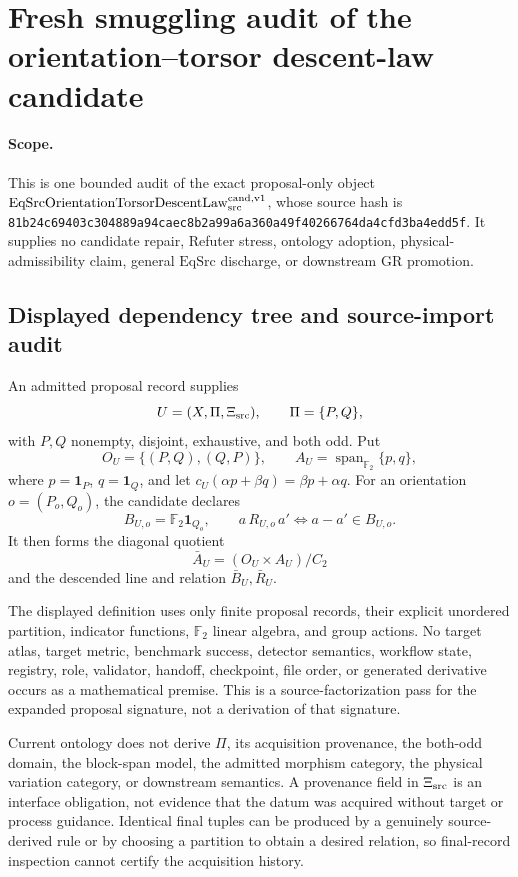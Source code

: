 \section{Fresh smuggling audit of the orientation--torsor descent-law candidate}

\paragraph{Scope.}
This is one bounded audit of the exact proposal-only object
\(\mathrm{EqSrcOrientationTorsorDescentLaw}_{\rm src}^{\rm cand,v1}\),
whose source hash is
\texttt{81b24c69403c304889a94caec8b2a99a6a360a49f40266764da4cfd3ba4edd5f}.
It supplies no candidate repair, Refuter stress, ontology adoption,
physical-admissibility claim, general \(\mathrm{EqSrc}\) discharge, or
downstream GR promotion.

\subsection{Displayed dependency tree and source-import audit}

An admitted proposal record supplies
\[
 U=(X,\Pi,\Xi_{\rm src}),\qquad \Pi=\{P,Q\},
\]
with \(P,Q\) nonempty, disjoint, exhaustive, and both odd.  Put
\[
 O_U=\{(P,Q),(Q,P)\},\qquad
 A_U=\operatorname{span}_{\mathbb F_2}\{p,q\},
\]
where \(p=\mathbf1_P\), \(q=\mathbf1_Q\), and let
\(c_U(\alpha p+\beta q)=\beta p+\alpha q\).  For an orientation
\(o=(P_o,Q_o)\), the candidate declares
\[
 B_{U,o}=\mathbb F_2\mathbf1_{Q_o},\qquad
 a\,R_{U,o}\,a'\Longleftrightarrow a-a'\in B_{U,o}.
\]
It then forms the diagonal quotient
\[
 \bar A_U=(O_U\times A_U)/C_2
\]
and the descended line and relation \(\bar B_U,\bar R_U\).

The displayed definition uses only finite proposal records, their explicit
unordered partition, indicator functions, \(\mathbb F_2\) linear algebra,
and group actions.  No target atlas, target metric, benchmark success,
detector semantics, workflow state, registry, role, validator, handoff,
checkpoint, file order, or generated derivative occurs as a mathematical
premise.  This is a source-factorization pass for the expanded proposal
signature, not a derivation of that signature.

Current ontology does not derive \(\Pi\), its acquisition provenance, the
both-odd domain, the block-span model, the admitted morphism category, the
physical variation category, or downstream semantics.  A provenance field in
\(\Xi_{\rm src}\) is an interface obligation, not evidence that the datum was
acquired without target or process guidance.  Identical final tuples can be
produced by a genuinely source-derived rule or by choosing a partition to
obtain a desired relation, so final-record inspection cannot certify the
acquisition history.

